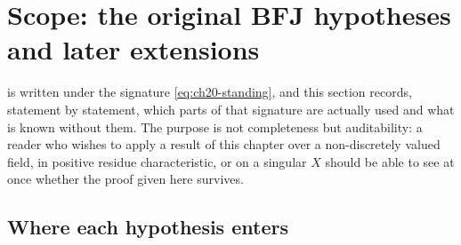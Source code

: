 \section{Scope: the original BFJ hypotheses and later extensions}
\label{sec:ch20-scope}

 is written under the signature
\eqref{eq:ch20-standing}, and this section records, statement by statement,
which parts of that signature are actually used and what is known without
them.  The purpose is not completeness but auditability: a reader who
wishes to apply a result of this chapter over a non-discretely valued field,
in positive residue characteristic, or on a singular \(X\) should be able to
see at once whether the proof given here survives.

\subsection{Where each hypothesis enters}
\label{sec:ch20-hypothesis-use}

